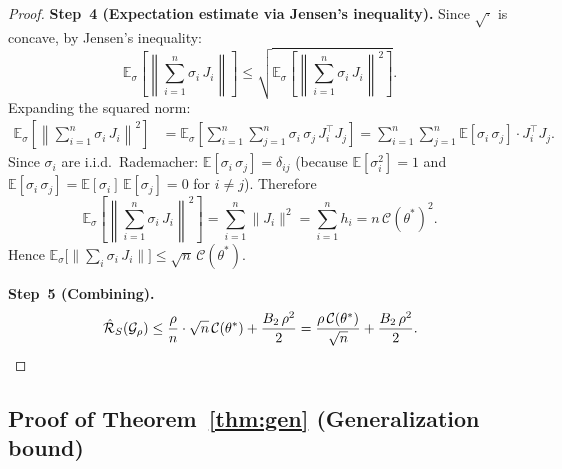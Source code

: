 \documentclass[11pt,a4paper]{article}
\theoremstyle{definition}
\theoremstyle{remark}
\newcommand{\E}{\mathbb{E}}
\newcommand{\cC}{\mathcal{C}}
\newcommand{\cG}{\mathcal{G}}
\begin{document}
\begin{proof}
\textbf{Step~4 (Expectation estimate via Jensen's inequality).}\;
Since $\sqrt{\cdot}$ is concave, by Jensen's inequality:
\[
  \E_\sigma\!\left[\left\|\sum_{i=1}^n \sigma_i\, J_i\right\|\right]
  \leq \sqrt{\E_\sigma\!\left[\left\|\sum_{i=1}^n \sigma_i\, J_i\right\|^2\right]}.
\]
Expanding the squared norm:
\begin{align*}
  \E_\sigma\!\left[\left\|\sum_{i=1}^n \sigma_i\, J_i\right\|^2\right]
  &= \E_\sigma\!\left[\sum_{i=1}^n \sum_{j=1}^n
     \sigma_i\, \sigma_j\, J_i^\top J_j\right]
  = \sum_{i=1}^n \sum_{j=1}^n \E[\sigma_i\, \sigma_j] \cdot J_i^\top J_j.
\end{align*}
Since $\sigma_i$ are i.i.d.\ Rademacher:
$\E[\sigma_i\,\sigma_j] = \delta_{ij}$
(because $\E[\sigma_i^2] = 1$ and
$\E[\sigma_i\,\sigma_j] = \E[\sigma_i]\,\E[\sigma_j] = 0$ for $i \neq j$).
Therefore
\[
  \E_\sigma\!\left[\left\|\sum_{i=1}^n \sigma_i\, J_i\right\|^2\right]
  = \sum_{i=1}^n \|J_i\|^2 = \sum_{i=1}^n h_i = n\,\cC(\theta^*)^2.
\]
Hence $\E_\sigma\!\bigl[\|\sum_i \sigma_i\, J_i\|\bigr]
\leq \sqrt{n}\,\cC(\theta^*)$.

\textbf{Step~5 (Combining).}\;
\[
  \hat{\mathcal{R}}_S(\cG_\rho)
  \leq \frac{\rho}{n} \cdot \sqrt{n}\,\cC(\theta^*)
  + \frac{B_2\,\rho^2}{2}
  = \frac{\rho\,\cC(\theta^*)}{\sqrt{n}} + \frac{B_2\,\rho^2}{2}.
  \qedhere
\]
\end{proof}

\subsection{Proof of Theorem~\ref{thm:gen} (Generalization bound)}
\end{document}
